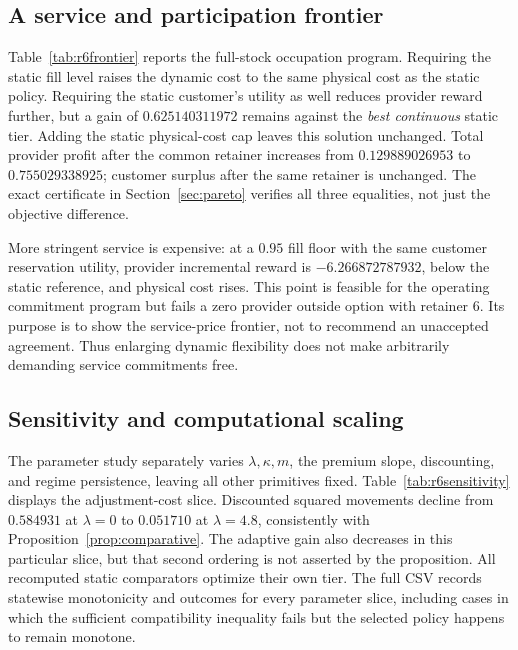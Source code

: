 \subsection{A service and participation frontier}
Table~\ref{tab:r6frontier} reports the full-stock occupation program. Requiring the static fill level raises the dynamic cost to the same physical cost as the static policy. Requiring the static customer's utility as well reduces provider reward further, but a gain of $0.625140311972$ remains against the \emph{best continuous} static tier. Adding the static physical-cost cap leaves this solution unchanged. Total provider profit after the common retainer increases from $0.129889026953$ to $0.755029338925$; customer surplus after the same retainer is unchanged. The exact certificate in Section~\ref{sec:pareto} verifies all three equalities, not just the objective difference.

More stringent service is expensive: at a $0.95$ fill floor with the same customer reservation utility, provider incremental reward is $-6.266872787932$, below the static reference, and physical cost rises. This point is feasible for the operating commitment program but fails a zero provider outside option with retainer 6. Its purpose is to show the service-price frontier, not to recommend an unaccepted agreement. Thus enlarging dynamic flexibility does not make arbitrarily demanding service commitments free.


\subsection{Sensitivity and computational scaling}
The parameter study separately varies $\lambda,\kappa,m$, the premium slope, discounting, and regime persistence, leaving all other primitives fixed. Table~\ref{tab:r6sensitivity} displays the adjustment-cost slice. Discounted squared movements decline from $0.584931$ at $\lambda=0$ to $0.051710$ at $\lambda=4.8$, consistently with Proposition~\ref{prop:comparative}. The adaptive gain also decreases in this particular slice, but that second ordering is not asserted by the proposition. All recomputed static comparators optimize their own tier. The full CSV records statewise monotonicity and outcomes for every parameter slice, including cases in which the sufficient compatibility inequality fails but the selected policy happens to remain monotone.


